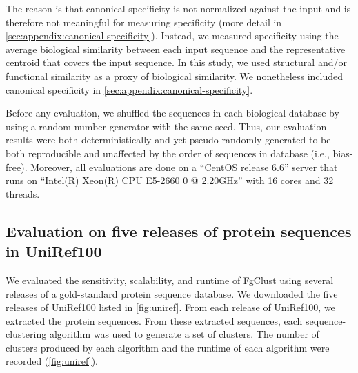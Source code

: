 \documentclass[11pt,letterpaper]{llncs2e/llncs}
\begin{document}
The reason is that canonical specificity is not normalized against the input and is therefore not meaningful for measuring specificity (more detail in \cref{sec:appendix:canonical-specificity}).
Instead, we measured specificity using the average biological similarity between each input sequence and the representative centroid that covers the input sequence.
In this study, we used structural and/or functional similarity as a proxy of biological similarity. %
We nonetheless included canonical specificity in \cref{sec:appendix:canonical-specificity}.

Before any evaluation, we shuffled the sequences in each biological database by using a random-number generator with the same seed.
Thus, our evaluation results were both deterministically and yet pseudo-randomly generated to be both reproducible and unaffected by the order of sequences in database (i.e., bias-free).
Moreover, all evaluations are done on a ``CentOS release 6.6'' server that runs on ``Intel(R) Xeon(R) CPU E5-2660 0 @ 2.20GHz'' with 16 cores and 32 threads.

\subsection{Evaluation on five releases of protein sequences in UniRef100}

We evaluated the sensitivity, scalability, and runtime of FgClust using several releases of a gold-standard protein sequence database.
We downloaded the five releases of UniRef100 \citep{suzek2007uniref} listed in \cref{fig:uniref}.
From each release of UniRef100, we extracted the protein sequences.
From these extracted sequences, each sequence-clustering algorithm was used to generate a set of clusters.
The number of clusters produced by each algorithm and the runtime of each algorithm were recorded (\cref{fig:uniref}).
\end{document}
